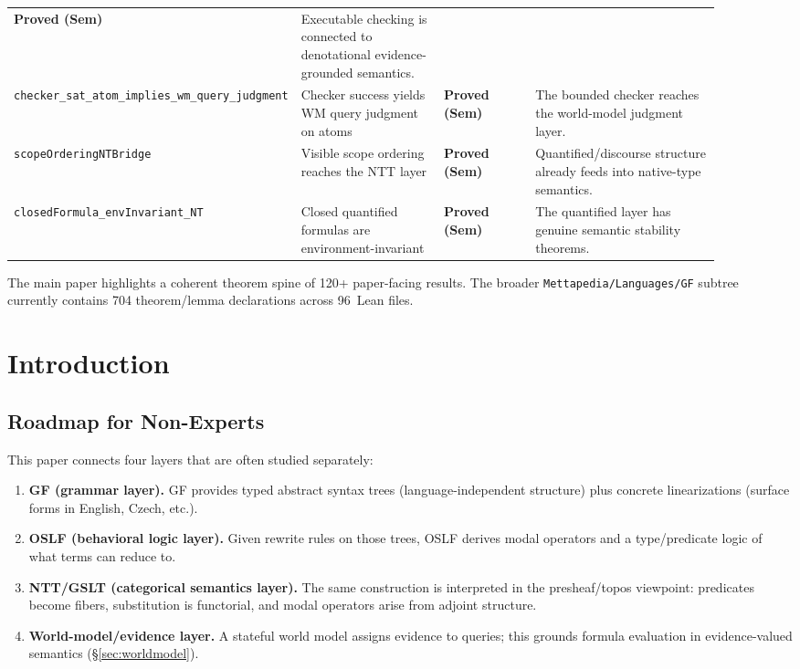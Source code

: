 \documentclass[11pt]{article}
\newcommand{\code}[1]{\texttt{#1}}
\newcommand{\OSLF}{\textup{OSLF}}
\newcommand{\GF}{\textup{GF}}
\newcommand{\NTT}{\textup{NTT}}
\begin{document}
\begin{center}
\begin{tabular}{@{}p{0.26\linewidth}p{0.22\linewidth}p{0.14\linewidth}p{0.28\linewidth}@{}}
\textbf{Proved (Sem)} &
Executable checking is connected to denotational evidence-grounded semantics. \\
\code{checker\_sat\_atom\_implies\_wm\_query\_judgment} &
Checker success yields WM query judgment on atoms &
\textbf{Proved (Sem)} &
The bounded checker reaches the world-model judgment layer. \\
\code{scopeOrderingNTBridge} &
Visible scope ordering reaches the \NTT{} layer &
\textbf{Proved (Sem)} &
Quantified/discourse structure already feeds into native-type semantics. \\
\code{closedFormula\_envInvariant\_NT} &
Closed quantified formulas are environment-invariant &
\textbf{Proved (Sem)} &
The quantified layer has genuine semantic stability theorems. \\
\bottomrule
\end{tabular}
\end{center}
\noindent
The main paper highlights a coherent theorem spine of 120+ paper-facing results.
The broader \code{Mettapedia/Languages/GF} subtree currently contains 704
theorem/lemma declarations across 96~Lean files.

\tableofcontents

\section{Introduction}
\label{sec:intro}

\subsection{Roadmap for Non-Experts}

This paper connects four layers that are often studied separately:

\begin{enumerate}
\item \textbf{\GF{} (grammar layer).}  \GF{} provides typed abstract syntax trees
  (language-independent structure) plus concrete linearizations (surface forms
  in English, Czech, etc.).
\item \textbf{\OSLF{} (behavioral logic layer).}  Given rewrite rules on those
  trees, \OSLF{} derives modal operators and a type/predicate logic of what
  terms can reduce to.
\item \textbf{\NTT{}/GSLT (categorical semantics layer).}  The same construction
  is interpreted in the presheaf/topos viewpoint: predicates become fibers,
  substitution is functorial, and modal operators arise from adjoint structure.
\item \textbf{World-model/evidence layer.}  A stateful world model assigns
  evidence to queries; this grounds formula evaluation in evidence-valued
  semantics (\S\ref{sec:worldmodel}).
\end{enumerate}
\end{document}
